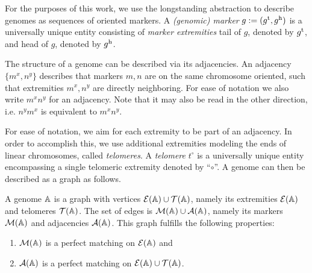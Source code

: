 \documentclass[runningheads]{llncs}
\begin{document}
%

For the purposes of this work, we use the longstanding abstraction to describe genomes as sequences of oriented markers.
A \emph{(genomic) marker} $g := (g^{\textnormal{t}}, g^{\textnormal{h}})$ is a universally unique entity consisting of \emph{marker extremities} tail of $g$, denoted by $g^{\textnormal{t}}$, and head of $g$, denoted by $g^{\textnormal{h}}$.

The structure of a genome can be described via its adjacencies. An adjacency $\{m^x,n^y\}$ describes that markers $m,n$ are on the same chromosome oriented, such that extremities $m^x,n^y$ are directly neighboring. For ease of notation we also write $m^xn^y$ for an adjacency. Note that it may also be read in the other direction, i.e. $n^ym^x$ is equivalent to $m^xn^y$. 

For ease of notation, we aim for each extremity to be part of an adjacency. In order to accomplish this, we use additional extremities modeling the ends of linear chromosomes, called \emph{telomeres}.
A \emph{telomere} $t^\circ$ is a universally unique entity encompassing a single telomeric extremity denoted by ``$\circ$''.
A genome can then be described as a graph as follows.

\begin{definition}\label{def:genome}
A genome $\mathbb{A}$ is a graph with vertices $\mathcal{E}(\mathbb{A})\cup\mathcal{T} (\mathbb{A})$, namely its extremities $\mathcal{E}(\mathbb{A})$ and  telomeres $\mathcal{T} (\mathbb{A})$. The set of edges is $\mathcal{M}(\mathbb{A})\cup\mathcal{A}(\mathbb{A})$, namely its markers $\mathcal{M}(\mathbb{A})$ and adjacencies $\mathcal{A}(\mathbb{A})$.
This graph fulfills the following properties:
\begin{enumerate}
	\item\label{itm:markers} $\mathcal{M} (\mathbb{A})$ is a perfect matching on $\mathcal{E}(\mathbb{A})$ and
	\item $\mathcal{A}(\mathbb{A})$ is a perfect matching on $\mathcal{E}(\mathbb{A})\cup\mathcal{T} (\mathbb{A})$.
\end{enumerate}
\end{definition}
\end{document}
